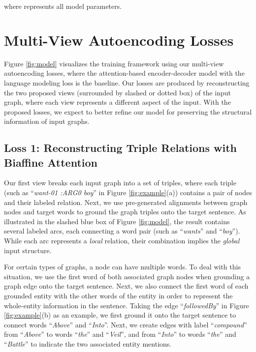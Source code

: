 \documentclass[11pt,a4paper]{article}
\begin{document}
where  represents all model parameters.


\section{Multi-View Autoencoding Losses}


Figure \ref{fig:model} visualizes the training framework using our multi-view autoencoding losses, where the attention-based encoder-decoder model with the language modeling loss is the baseline.
Our losses are produced by reconstructing the two proposed views (surrounded by slashed or dotted box) of the input graph, where each view represents a different aspect of the input.
With the proposed losses, we expect to better refine our model for preserving the structural information of input graphs.


\subsection{Loss 1: Reconstructing Triple Relations with Biaffine Attention}


Our first view breaks each input graph into a set of triples, where each triple (such as ``\emph{want-01 :ARG0 boy}'' in Figure \ref{fig:example}(a)) contains a pair of nodes and their labeled relation.
Next, we use pre-generated alignments between graph nodes and target words to ground the graph triples onto the target sentence.
As illustrated in the slashed blue box of Figure \ref{fig:model}, the result contains several labeled arcs, each connecting a word pair (such as ``\emph{wants}'' and ``\emph{boy}'').
While each arc represents a \emph{local} relation, their combination implies the \emph{global} input structure.


For certain types of graphs, a node can have multiple words.
To deal with this situation, we use the first word of both associated graph nodes when grounding a graph edge onto the target sentence.
Next, 
we also connect the first word of each grounded entity with the other words of the entity in order to represent the whole-entity information in the sentence.
Taking the edge ``\emph{followedBy}'' in Figure \ref{fig:example}(b) as an example, we first ground it onto the target sentence to connect words ``\emph{Above}'' and ``\emph{Into}''.
Next, we create edges with label ``\emph{compound}'' from ``\emph{Above}'' to words ``\emph{the}'' and ``\emph{Veil}'', and from ``\emph{Into}'' to words ``\emph{the}'' and  ``\emph{Battle}'' to indicate the two associated entity mentions.
\end{document}
